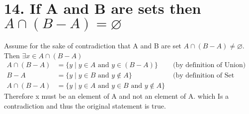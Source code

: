 \documentclass{article}
\newcommand{\nullset}{\varnothing}
\begin{document}
	\section*{14. If A and B are sets then $A \cap (B-A)= \nullset$}
	Assume for the sake of contradiction that A and B are set $A \cap (B-A) \neq \nullset$. Then $\exists x \in A \cap (B-A)$
	\begin{align*}
		A \cap (B-A) &= \{y \mid y \in A  \text{ and } y \in(B-A)\} &\text{ (by definition of Union)} \\
		B-A          &= \{y \mid y \in B \text{ and } y \not\in A\} &\text{ (by definition of Set Subtraction)} \\
		A \cap (B-A) &= \{y \mid y \in A  \text{ and } y \in B \text{ and } y \not\in A\} 
	\end{align*}
	Therefore x must be an element of A and not an element of A. which Is a contradiction and thus the original statement is true.
	
\end{document}
